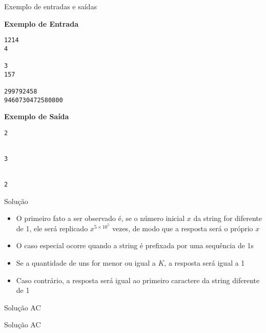 \begin{frame}[fragile]{Exemplo de entradas e saídas}

\begin{minipage}[t]{0.5\textwidth}
\textbf{Exemplo de Entrada}
\begin{verbatim}
1214
4

3
157

299792458
9460730472580800
\end{verbatim}
\end{minipage}
\begin{minipage}[t]{0.45\textwidth}
\textbf{Exemplo de Saída}
\begin{verbatim}
2


3


2
\end{verbatim}
\end{minipage}
\end{frame}

\begin{frame}[fragile]{Solução}

    \begin{itemize}
        \item O primeiro fato a ser observado é, se o número inicial $x$ da string for diferente de 
        1, ele será replicado $x^{5\times 10^5}$ vezes, de modo que a resposta será o próprio $x$

        \item O caso especial ocorre quando a string é prefixada por uma sequência de 1s

        \item Se a quantidade de uns for menor ou igual a $K$, a resposta será igual a 1

        \item Caso contrário, a resposta será igual ao primeiro caractere da string diferente de
            1
    \end{itemize}

\end{frame}

\begin{frame}[fragile]{Solução AC}
\end{frame}

\begin{frame}[fragile]{Solução AC}
\end{frame}
